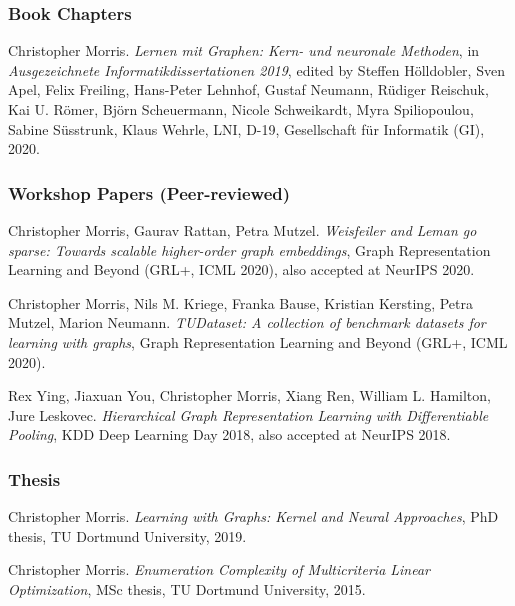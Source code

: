 \documentclass[11pt, a4paper, DIV=12]{scrartcl}
\begin{document}
\begin{thebibliography}{5}
\subsubsection*{Book Chapters}
Christopher Morris.
\emph{Lernen mit Graphen: Kern- und neuronale Methoden}, in 
\emph{Ausgezeichnete Informatikdissertationen 2019}, edited by Steffen H{\"o}lldobler, Sven Apel, Felix Freiling, Hans-Peter Lehnhof, Gustaf Neumann, R{\"u}diger Reischuk, Kai U. R{\"o}mer, Bj{\"o}rn Scheuermann, Nicole Schweikardt, Myra Spiliopoulou, Sabine S{\"u}sstrunk, Klaus Wehrle, LNI, D-19, Gesellschaft f{\"u}r Informatik (GI), 2020. 

\subsubsection*{Workshop Papers (Peer-reviewed)}

Christopher Morris, Gaurav Rattan, Petra Mutzel.
\emph{Weisfeiler and Leman go sparse: Towards scalable higher-order graph embeddings},
Graph Representation Learning and Beyond (GRL+, ICML 2020), also accepted at NeurIPS 2020.

Christopher Morris, Nils M. Kriege, Franka Bause, Kristian Kersting, Petra Mutzel, Marion Neumann.
\emph{TUDataset: A collection of benchmark datasets for learning with graphs},
Graph Representation Learning and Beyond (GRL+, ICML 2020).

Rex Ying, Jiaxuan You, Christopher Morris, Xiang Ren, William L. Hamilton, Jure Leskovec.
\emph{Hierarchical Graph Representation Learning with Differentiable Pooling},
KDD Deep Learning Day 2018, also accepted at NeurIPS 2018.

\subsubsection*{Thesis}

Christopher Morris.
\emph{Learning with Graphs: Kernel and Neural Approaches}, PhD thesis, TU Dortmund University, 2019.

Christopher Morris.
\emph{Enumeration Complexity of Multicriteria Linear Optimization}, MSc thesis, TU Dortmund University, 2015.

	

\end{thebibliography}
\end{document}

